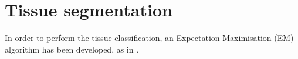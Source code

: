 \section{Tissue segmentation}


In order to perform the tissue classification, an Expectation-Maximisation (EM) algorithm has been developed, as in \cite{leemput_automated_1999-1}.

